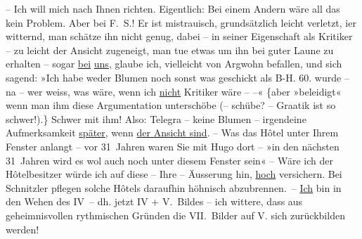 \begin{ledgroupsized}[t]{13cm}
               – Ich will mich nach Ihnen richten. Eigentlich: Bei einem Andern wäre all das kein
               Problem. Aber {\pb}bei F. S.! Er ist mistrauisch, grundsätzlich leicht verletzt, i{\geminationm}er witternd, man schätze ihn nicht  genug, dabei – in seiner Eigenschaft als Kritiker –
               zu leicht der Ansicht zugeneigt, man tue etwas um ihn bei guter Laune zu erhalten –
               sogar \uline{bei}{ }\uline{uns}, glaube ich, vielleicht von Argwohn befallen, und
               sich sagend: {\pb}»Ich habe weder
               Blumen noch sonst was geschickt als B-H. 60. wurde – na – wer weiss, was wäre, wenn
               ich \uline{nicht} Kritiker wäre – –« {\{}aber »beleidigt« wenn man ihm diese
               Argumentation unterschöbe (– schübe? – Gra{\geminationm}atik ist so
                  schwer!).{\}} Schwer mit ihm! Also: Telegra{\geminationm} – keine Blumen – irgendeine Aufmerksamkeit \uline{später}, wenn {\pb}\uline{\label{T_L02521_1v}\label{T_L02521_1h} der Ansicht sind}.\pend
           \pstart
           \numberlinefalse{}\centering{}–\numberlinetrue{}\pend
           \pstart
           \noindent{}Was das Hôtel unter Ihrem Fenster anlangt – vor 31 Jahren \introOben{}waren
                  Sie\introOben{} mit Hugo dort – »in den nächsten
               31 Jahren \introOben{}wird es\introOben{} wol auch noch unter diesem Fenster \introOben{}sein\introOben{}« – Wäre ich der Hôtelbesitzer würde ich auf diese – Ihre
               – Äusserung hin, \uline{hoch} versichern. Bei Schnitzler
               pflegen solche Hôtels daraufhin {\pb}höhnisch abzubrennen. – \uline{Ich} bin in den Wehen des
                  IV – dh. jetzt IV + V. Bildes – ich wittere, dass  aus geheimnisvollen rythmischen Gründen die VII. Bilder auf V.  sich zurückbilden werden!\pend

\end{ledgroupsized}
